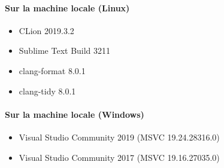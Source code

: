 \documentclass[a4paper,11pt,twoside,french,report]{../common/simplem}
\begin{document}
			\paragraph*{Sur la machine locale (Linux)}
				\begin{itemize}
					\item CLion 2019.3.2
					\item Sublime Text Build 3211
					\item clang-format 8.0.1
					\item clang-tidy 8.0.1
				\end{itemize}
			\paragraph*{Sur la machine locale (Windows)}
				\begin{itemize}
					\item Visual Studio Community 2019 (MSVC 19.24.28316.0)
					\item Visual Studio Community 2017 (MSVC 19.16.27035.0)
				\end{itemize}
\end{document}
